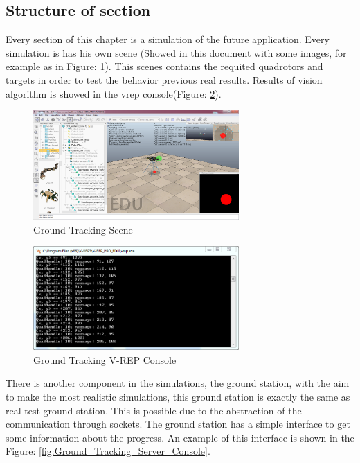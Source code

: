 \subsection{Structure of section}
Every section of this chapter is a simulation of the future application. Every simulation is has his own scene (Showed in this document with some images, for example as in Figure: \ref{fig:VREP_scene_example}). This scenes contains the requited quadrotors and targets in order to test the behavior previous real results. Results of vision algorithm is showed in the vrep console(Figure: \ref{fig:Ground_Tracking_VREP_Console}). \\

\begin{figure}[h]
	\includegraphics[width=0.7\textwidth,natwidth=1366,natheight=728]{../Images/c3/ground_tracking_scene.png}
	\caption{Ground Tracking Scene}
	\label{fig:VREP_scene_example}
\end{figure}

\begin{figure}[h]
	\includegraphics[width=0.7\textwidth,natwidth=677,natheight=342]{../Images/c3/ground_tracking_vrep_console.png}
	\caption{Ground Tracking V-REP Console}
	\label{fig:Ground_Tracking_VREP_Console}
\end{figure}

There is another component in the simulations, the ground station, with the aim to make the most realistic simulations, this ground station is exactly the same as real test ground station. This is possible due to the abstraction of the communication through sockets. The ground station has a simple interface to get some information about the progress. An example of this interface is shown in the Figure: \ref{fig:Ground_Tracking_Server_Console}.

